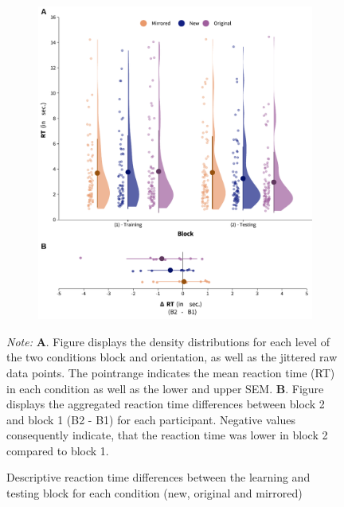 \documentclass[
  man,floatsintext]{apa7}
\begin{document}
\begin{figure}[H]

\begin{figure}

{\centering \includegraphics[width=0.8\linewidth]{../results/figures/combined_rt_diff} 

}

\end{figure}

\caption{Descriptive reaction time differences between the learning and testing block for each condition (new, original and mirrored)
\label{fig:rt-diff}}
\begingroup
\footnotesize
\textit{Note:} \textbf{A}. Figure displays the density distributions for each level of the two conditions block and orientation, as well as the jittered raw data points. The pointrange indicates the mean reaction time (RT) in each condition as well as the lower and upper SEM. \textbf{B}. Figure displays the aggregated reaction time differences between block 2 and block 1 (B2 - B1) for each participant. Negative values consequently indicate, that the reaction time was lower in block 2 compared to block 1.
\endgroup
\end{figure}
\end{document}
